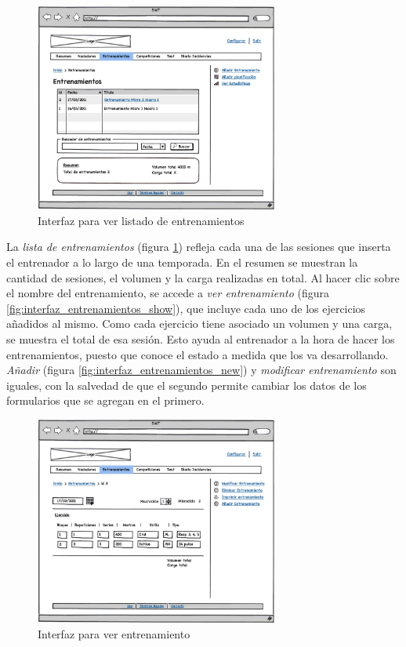		\begin{figure}[H]
		  \centering
		    \includegraphics[width=8cm]{./eps/p_interfaz/18_Entrenamientos.eps}
		  \caption{Interfaz para ver listado de entrenamientos}
		  \label{fig:interfaz_entrenamientos}
		\end{figure}
		
	La {\it lista de entrenamientos} (figura \ref{fig:interfaz_entrenamientos}) refleja cada una de las sesiones que inserta el entrenador a lo largo de una temporada. En el resumen se muestran la cantidad de sesiones, el volumen y la carga realizadas en total. Al hacer clic sobre el nombre del entrenamiento, se accede a {\it ver entrenamiento} (figura \ref{fig:interfaz_entrenamientos_show}), que incluye cada uno de los ejercicios añadidos al mismo. Como cada ejercicio tiene asociado un volumen y una carga, se muestra el total de esa sesión. Esto ayuda al entrenador a la hora de hacer los entrenamientos, puesto que conoce el estado a medida que los va desarrollando.\\
	\newline
	{\it Añadir} (figura \ref{fig:interfaz_entrenamientos_new}) y {\it modificar entrenamiento} son iguales, con la salvedad de que el segundo permite cambiar los datos de los formularios que se agregan en el primero.

		\begin{figure}[H]
		  \centering
		    \includegraphics[width=8cm]{./eps/p_interfaz/20_Entrenamientos_show.eps}
		  \caption{Interfaz para ver entrenamiento}
		  \label{fig:interfaz_competiciones_show}
		\end{figure}
	
